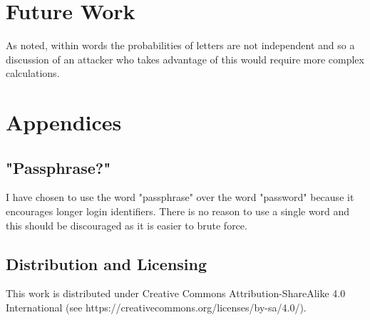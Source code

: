 \documentclass[11pt,a4paper]{article}
\begin{document}
\section{Future Work}
As noted, within words the probabilities of letters are not independent and so a discussion of an attacker who takes advantage of this would require more complex calculations.  

\section{Appendices}
\subsection{"Passphrase?"}
I have chosen to use the word "passphrase" over the word "password" because it encourages longer login identifiers. There is no reason to use a single word and this should be discouraged as it is easier to brute force.

\subsection{Distribution and Licensing}
This work is distributed under  Creative Commons Attribution-ShareAlike 4.0 International (see https://creativecommons.org/licenses/by-sa/4.0/).
\end{document}
